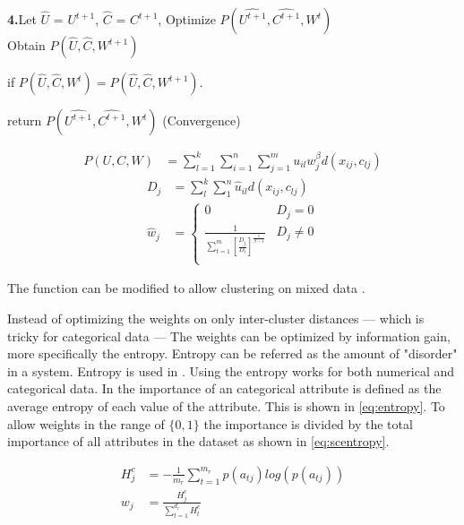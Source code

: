 \documentclass[../report.tex]{subfiles}
\begin{document}
\textbf{4.}\quad Let $\hat{U}$ = $U^{t+1}$, $\hat{C}$ = $C^{t+1}$, Optimize $P(\hat{U^{t+1}}, \hat{ C^{t + 1} }, W^{t})$ \\
\quad  Obtain $P(\hat{U}, \hat{ C }, W^{t + 1})$
\begin{description}
  \item if $P(\hat{U}, \hat{ C }, W^{t}) = P(\hat{U}, \hat{ C }, W^{t + 1})$.

  \item \quad return $P(\hat{U^{t+1}}, \hat{ C^{t + 1} }, W^{t})$ (Convergence)
\end{description}

\begin{align}
  \label{eq:cost_w_weight}
  P(U,C,W) &= \sum^k_{l=1} \sum^n_{i=1} \sum^m_{j=1} u_{il} w_j^{\beta} d(x_{ij},c_{lj})
\end{align}
\begin{align}
D_j &= \sum^{ k }_{ l }{\sum^n_1 {\hat{u}_{il} d(x_{ ij }, c_ { lj } )}} \\
\label{eq:optimW}
\hat{w}_j &=
\begin{cases}
  0 & D_j = 0 \\
  \frac{1}{ \sum^m_{t=1} [\frac{ D_j }{ D_t }]^{ \frac{ 1 }{ \beta - 1 } } } & D_j \neq 0 \\
\end{cases}
\end{align}

The function can be modified to allow clustering on mixed data \cite{Jia2018}.

Instead of optimizing the weights on only inter-cluster distances --- which is tricky for categorical data --- The weights can be optimized by information gain, more specifically the entropy. Entropy can be referred as the amount of "disorder" in a system. Entropy is used in \cite{Cheung2013, Jing2007}. Using the entropy works for both numerical and categorical data. In \cite{Cheung2013} the importance of an categorical attribute is defined as the average entropy of each value of the attribute. This is shown in \ref{eq:entropy}. To allow weights in the range of $\{0,1\}$ the importance is divided by the total importance of all attributes in the dataset as shown in \ref{eq:scentropy}.

\begin{align}
  H_j^c & =  - \frac{1}{m_r} \sum^{m_r}_{t = 1}{p(a_{tj}) log(p(a_{tj}))} 
\label{eq:entropy} \\
  w_j & = \frac{H_j^c}{\sum_{t = 1}^{d_c}{H_t^c}}
  \label{eq:scentropy}
\end{align}
\end{document}
